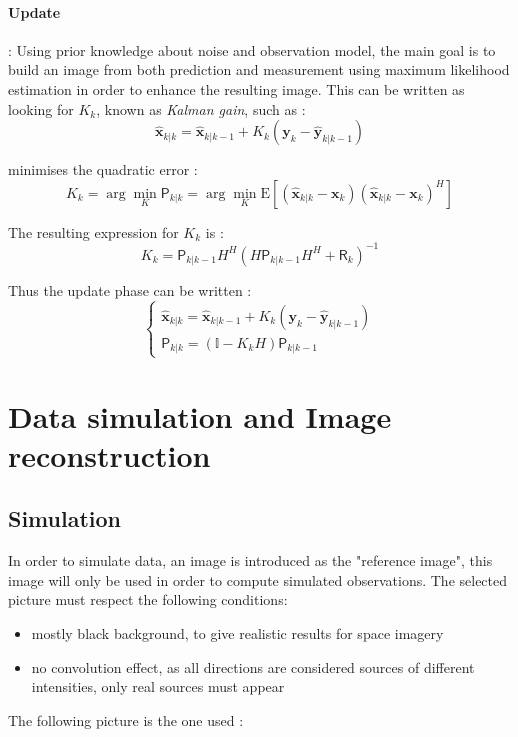 \documentclass[titlepage,11pt]{article}
\newcommand{\autocorr}[1]{\expval{(#1)(#1)^H}}
\renewcommand{\expval}[1]{\text{E}\left[#1\right]}
\newcommand{\R}{\boldsymbol{\mathsf{R}}}
\newcommand{\x}{\boldsymbol{x}}
\newcommand{\y}{\boldsymbol{y}}
\newcommand{\xp}{\widehat{\x}_{k|k-1}}
\newcommand{\xe}{\widehat{\x}_{k|k}}
\newcommand{\yp}{\widehat{\y}_{k|k-1}}
\newcommand{\Pp}{\boldsymbol{\mathsf{P}}_{k|k-1}}
\newcommand{\Pe}{\boldsymbol{\mathsf{P}}_{k|k}}
\begin{document}
	\paragraph{Update} : Using prior knowledge about noise and observation model, the main goal is to build an image from both prediction and measurement using maximum likelihood estimation in order to enhance the resulting image. This can be written as looking for $K_k$, known as \emph{Kalman gain}, such as :
	\begin{equation}
		\xe = \xp + K_k\left(\y_k - \yp\right)
	\end{equation}
	
	minimises the quadratic error :
	\begin{equation}
		K_k = \arg\min_K \Pe = \arg\min_K \autocorr{\xe - \x_k}
	\end{equation}
	
	The resulting expression for $K_k$ is \cite{intro_KF} :
	\begin{equation}
		K_k = \Pp H^H\left(H\Pp H^H + \R_k\right)^{-1}
	\end{equation}

	Thus the update phase can be written :
	\begin{equation}
		\begin{cases}
			\xe = \xp + K_k\left(\y_k - \yp\right) \\
			\Pe = \left(\mathbb{I} - K_kH\right)\Pp
		\end{cases}
	\end{equation}
	
		\section{Data simulation and Image reconstruction}
	\subsection{Simulation}
	
	In order to simulate data, an image is introduced as the "reference image", this image will only be used in order to compute simulated observations. The selected picture must respect the following conditions:
	\begin{itemize}
		\item mostly black background, to give realistic results for space imagery
		\item no convolution effect, as all directions are considered sources of different intensities, only real sources must appear
	\end{itemize}
	The following picture is the one used :
	
\end{document}
